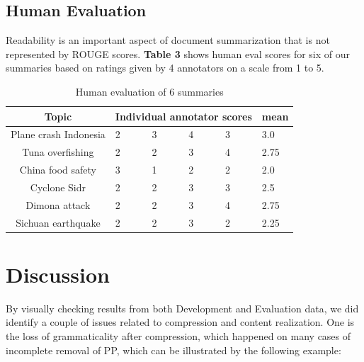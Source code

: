\documentclass[11pt]{article}
\begin{document}
\subsection{Human Evaluation}
Readability is an important aspect of document summarization that is not represented by ROUGE scores. \textbf{Table 3} shows human eval scores for six of our summaries based on ratings given by 4 annotators on a scale from 1 to 5.

\begin{table}[h]
	\centering
	\begin{tabular}{|c|p{1cm}|p{1cm}|p{1cm}|p{1cm}|p{1cm}|}
	\hline
		\textbf{Topic} & \multicolumn{4}{|c|}{\textbf{Individual annotator scores}} & \textbf{mean}\\
	\hline
	Plane crash Indonesia & 2 & 3 & 4 & 3 & 3.0\\
	\hline
	Tuna overfishing & 2 & 2 & 3 & 4 & 2.75\\
	\hline
	China food safety & 3 & 1 & 2 & 2 & 2.0\\
	\hline
	Cyclone Sidr & 2 & 2 & 3 & 3 & 2.5\\
	\hline
	Dimona attack & 2 & 2 & 3 & 4 & 2.75 \\
	\hline
	Sichuan earthquake & 2 & 2 & 3 & 2 & 2.25\\
	\hline
\end{tabular}
\caption{Human evaluation of 6 summaries}
\label{tab:dev}
\end{table}

\section{Discussion}

By visually checking results from both Development and Evaluation data, we did identify a couple of issues related to compression and content realization. One is the loss of grammaticality after compression, which happened on many cases of incomplete removal of PP, which can be illustrated by the following example:
\\

\\ 
\end{document}
